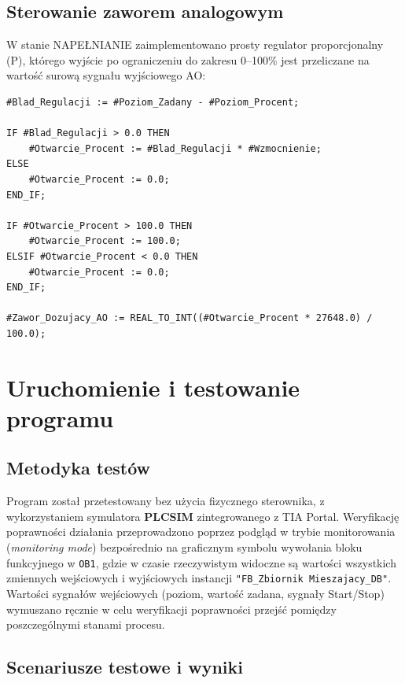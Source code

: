 \documentclass[12pt,a4paper]{report}
\begin{document}
\section{Sterowanie zaworem analogowym}

W stanie NAPEŁNIANIE zaimplementowano prosty regulator proporcjonalny (P), którego wyjście po ograniczeniu do zakresu 0--100\% jest przeliczane na wartość surową sygnału wyjściowego AO:

\begin{lstlisting}
#Blad_Regulacji := #Poziom_Zadany - #Poziom_Procent;

IF #Blad_Regulacji > 0.0 THEN
    #Otwarcie_Procent := #Blad_Regulacji * #Wzmocnienie;
ELSE
    #Otwarcie_Procent := 0.0;
END_IF;

IF #Otwarcie_Procent > 100.0 THEN
    #Otwarcie_Procent := 100.0;
ELSIF #Otwarcie_Procent < 0.0 THEN
    #Otwarcie_Procent := 0.0;
END_IF;

#Zawor_Dozujacy_AO := REAL_TO_INT((#Otwarcie_Procent * 27648.0) / 100.0);
\end{lstlisting}

\chapter{Uruchomienie i testowanie programu}

\section{Metodyka testów}

Program został przetestowany bez użycia fizycznego sterownika, z wykorzystaniem symulatora \textbf{PLCSIM} zintegrowanego z TIA Portal. Weryfikację poprawności działania przeprowadzono poprzez podgląd w trybie monitorowania (\textit{monitoring mode}) bezpośrednio na graficznym symbolu wywołania bloku funkcyjnego w \texttt{OB1}, gdzie w czasie rzeczywistym widoczne są wartości wszystkich zmiennych wejściowych i wyjściowych instancji \texttt{"FB\_Zbiornik Mieszajacy\_DB"}. Wartości sygnałów wejściowych (poziom, wartość zadana, sygnały Start/Stop) wymuszano ręcznie w celu weryfikacji poprawności przejść pomiędzy poszczególnymi stanami procesu.

\section{Scenariusze testowe i wyniki}
\end{document}
